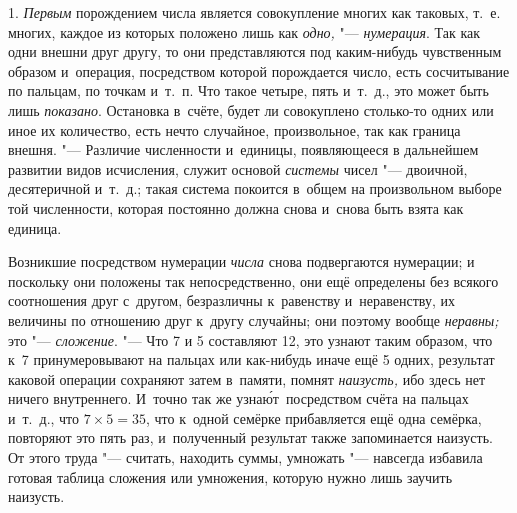 1. {\em Первым} порождением числа является совокупление многих как таковых, т.~е.
многих, каждое из которых положено лишь как {\em одно,} "--- {\em нумерация}.
Так как одни внешни друг другу, то они представляются под каким-нибудь
чувственным образом и~операция, посредством которой порождается число, есть
сосчитывание по пальцам, по точкам и~т.~п. Что такое четыре, пять и~т.~д., это
может быть лишь {\em показано}. Остановка в~счёте, будет ли совокуплено
столько-то одних или иное их количество, есть нечто случайное, произвольное,
так как граница внешня. "--- Различие численности и~единицы, появляющееся в
дальнейшем развитии видов исчисления, служит основой {\em системы} чисел "---
двоичной, десятеричной и~т.~д.; такая система покоится в~общем на произвольном
выборе той численности, которая постоянно должна снова и~снова быть взята как
единица.

Возникшие посредством нумерации {\em числа} снова подвергаются нумерации; и
поскольку они положены так непосредственно, они ещё определены без всякого
соотношения друг с~другом, безразличны к~равенству и~неравенству, их величины
по отношению друг к~другу случайны; они поэтому вообще {\em неравны;} это "---
{\em сложение}. "--- Что 7 и 5 составляют 12, это узнают таким образом, что к~7
принумеровывают на пальцах или как-нибудь иначе ещё 5 одних, результат каковой
операции сохраняют затем в~памяти, помнят {\em наизусть,} ибо здесь нет ничего
внутреннего. И~точно так же узна\'{ю}т~посредством счёта на пальцах и~т.~д.,
что $7\times 5=35$, что к~одной семёрке прибавляется ещё одна семёрка,
повторяют это пять раз, и~полученный результат также запоминается наизусть. От
этого труда "--- считать, находить суммы, умножать "--- навсегда избавила
готовая таблица сложения или умножения, которую нужно лишь заучить наизусть.

